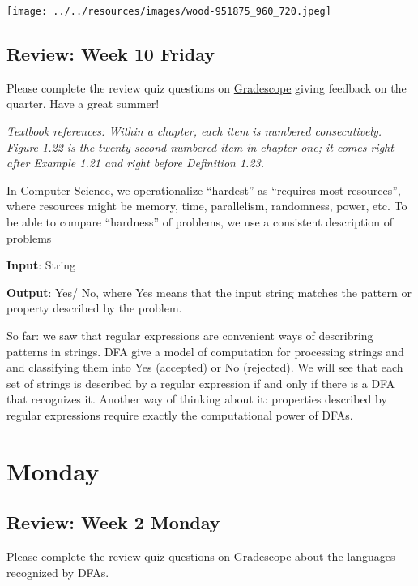 \begin{center}
\texttt{[image: ../../resources/images/wood-951875\_960\_720.jpeg]}
\end{center}

\vfill

\subsection*{Review: Week 10 Friday}

Please complete the review quiz questions on \href{http://gradescope.com}{Gradescope} giving feedback on the quarter. 
Have a great summer!
\newpage

{\it Textbook references: Within a chapter, each item is numbered consecutively. Figure 1.22
is the twenty-second numbered item in chapter one; it comes right after Example 1.21 and right before Definition 1.23.}

In Computer Science, we operationalize ``hardest'' as ``requires most resources'', where
resources might be memory, time, parallelism, randomness, power, etc.
To be able to compare ``hardness'' of problems, we use a consistent description of problems

{\bf Input}: String

{\bf Output}: Yes/ No, where Yes means that the input string matches the pattern or property described by the problem.

So far: we saw that regular expressions are convenient ways of describring patterns in strings.
DFA give a model of computation for processing strings and and classifying them into Yes (accepted)
or No (rejected). We will see that each set of strings is described by a regular expression if and only 
if there is a DFA that recognizes it.  Another way of thinking about it: properties described by regular
expressions require exactly the computational power of DFAs.


\section*{Monday}


    
\newpage
\subsection*{Review: Week 2 Monday}

Please complete the review quiz questions on \href{http://gradescope.com}{Gradescope} about 
the languages recognized by DFAs.


